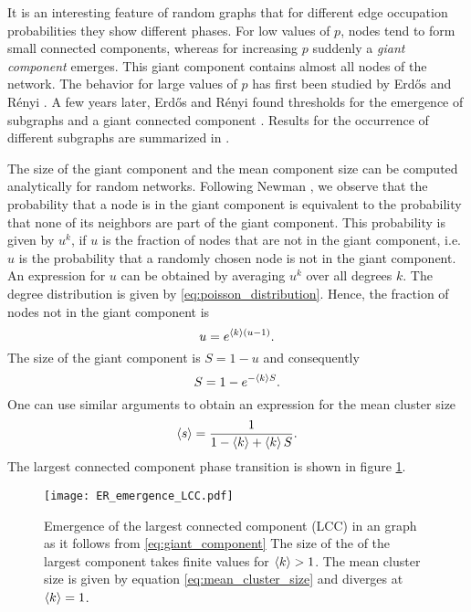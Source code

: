 It is an interesting feature of random graphs that for different edge occupation probabilities they show different phases.
For low values of $p$, nodes tend to form small connected components, whereas for increasing $p$ suddenly a \emph{giant component} emerges.
This giant component contains almost all nodes of the network.
The behavior for large values of $p$ has first been studied by Erd\H{o}s and R\'enyi \citep{ER:1959}.
A few years later, Erd\H{o}s and R\'enyi found thresholds for the emergence of subgraphs and a giant connected component \citep{ER:1960,ER:1961}.
Results for the occurrence of different subgraphs are summarized in \citep{RevModPhys.74}.

The size of the giant component and the mean component size can be computed analytically for random networks.
Following Newman \citep{Newman2003}, we observe that the probability that a node is in the giant component is equivalent to the probability that none of its neighbors are part of the giant component.
This probability is given by $u^k$, if $u$ is the fraction of nodes that are not in the giant component, i.e. $u$ is the probability that a randomly chosen node is not in the giant component.
An expression for $u$ can be obtained by averaging $u^k$ over all degrees $k$.
The degree distribution is given by \eqref{eq:poisson_distribution}.
Hence, the fraction of nodes not in the giant component is
\[
u=e^{\left< k \right>(u-1)}.
\]
The size of the giant component is $S=1-u$ and consequently
\begin{equation}\label{eq:giant_component}
S=1-e^{-\left< k \right>S}.
\end{equation}
One can use similar arguments to obtain an expression for the mean cluster size \citep{Newman2003}
\begin{equation}\label{eq:mean_cluster_size}
\left< s \right>=\frac{1}{1-\left< k \right>+\left< k \right>S}.
\end{equation}
%
The largest connected component phase transition is shown in figure \ref{fig:ER_lcc_emergence}.
\begin{SCfigure}
\texttt{[image: ER\_emergence\_LCC.pdf]}
\caption{Emergence of the largest connected component (LCC) in an \ER graph as it follows from \eqref{eq:giant_component}
The size of the of the largest component takes finite values for $\left< k \right>>1$.
The mean cluster size is given by equation \eqref{eq:mean_cluster_size} and diverges at $\left< k \right>=1$.
}
\label{fig:ER_lcc_emergence}
\end{SCfigure}
%

